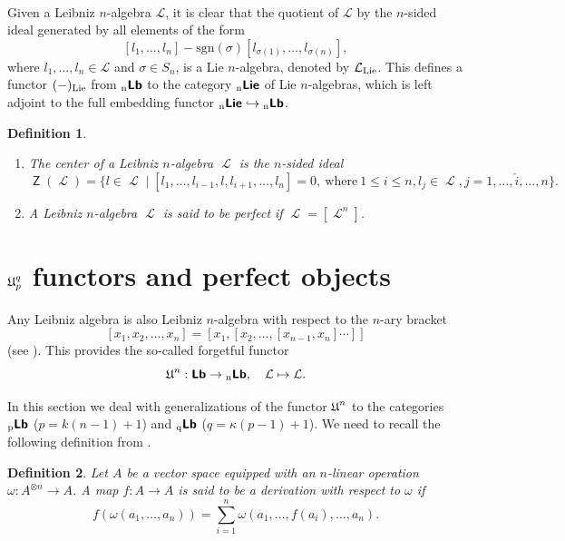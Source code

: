 \documentclass[12pt, reqno]{amsart}
\newtheorem{definition}{Definition}[section]
\def\Lb{\operatorname{\textbf{\textsf{Lb}}}}
\def\nLie{\operatorname{{}_{n}\textbf{\textsf{Lie}}}}
\def\nLb{\operatorname{{}_{n}\textbf{\textsf{Lb}}}}
\def\qLb{\operatorname{{}_{q}\textbf{\textsf{Lb}}}}
\def\pLb{\operatorname{{}_{p}\textbf{\textsf{Lb}}}}
\def\U{\operatorname{\frak{U}}}
\def\ele{\operatorname{\mathcal{L}}}
\DeclareMathOperator{\Z}{\mathsf {Z}}
\begin{document}
\

Given a Leibniz $n$-algebra $\mathcal{L}$, it is clear that the quotient of $\mathcal{L}$ by the $n$-sided ideal generated by all elements of the form
\[
[l_1, \dots , l_n]- {\text{sgn}(\sigma)}[l_{\sigma(1)}, \dots ,l_{\sigma(n)}],
\]
 where $l_1, \dots , l_n \in \mathcal{L}$ and $\sigma \in S_n$, is a Lie $n$-algebra, denoted by $\mathcal{L}_{\small{\text{Lie}}}$. This defines a functor
$(-)_{\small{\text{Lie}}}$ from $\nLb$ to the category $\nLie$ of Lie $n$-algebras, which is left adjoint to the full embedding functor $\nLie \hookrightarrow \nLb$.


\begin{definition}\
\begin{enumerate}
\item[i)] The {\it center}  of a Leibniz $n$-algebra ${\ele}$ is the $n$-sided ideal
\[
\Z({\ele}) = \{l \in {\ele} \mid [l_1, \dots, l_{i-1},l,l_{i+1}, \dots, l_n] = 0, \ \text{where} \  1 \leq i \leq n,  l_j \in {\ele}, j = 1, \dots, \hat{i}, \dots, n \}.
\]

\item[ii)] A Leibniz $n$-algebra ${\ele}$ is said to be {\it perfect} if ${\ele} = [{\ele}^n]$.
\end{enumerate}
\end{definition}

\section{ $\U_p^q$ functors and perfect objects}\label{Section U perfect}

Any Leibniz algebra is also Leibniz $n$-algebra with respect to
the $n$-ary bracket $$[x_1,x_2,\dots,x_n]=[x_1,[x_2,\dots,[x_{n-1},x_n]
\cdots ]]$$ (see \cite[Proposition 3.2]{CLP}). This provides the so-called forgetful functor
\[
\U^n:\Lb\to \nLb, \quad {\ele} \mapsto {\ele}.
\]




In this section we deal with generalizations of the functor $\U^n$ to the categories $\pLb$ ($p=k(n-1)+1$) and  $\qLb$ ($q=\kappa(p-1)+1$).
We need to recall the following definition from \cite{CLP}.
\begin{definition}
Let $A$ be a vector space equipped with an $n$-linear operation $\omega : A^{\otimes n} \to A$. A map
$f:A \to A$ is said to be a derivation with respect to $\omega$  if
\[
f(\omega(a_1, \dots,a_n)) = \sum_{i=1}^n  \omega(a_1, \dots, f(a_i), \dots,a_n).
\]
\end{definition}
\end{document}
